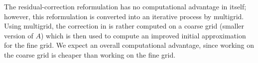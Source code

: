The residual-correction reformulation has no computational advantage in itself; however, this reformulation is converted into an iterative process by multigrid.
Using multigrid, the correction in  is rather computed on a coarse grid (smaller version of $A$) which is then used to compute an improved initial approximation for the fine grid.
We expect an overall computational advantage, since working on the coarse grid is cheaper than working on the fine grid.

\begin{figure}
	\centering

\end{figure}

